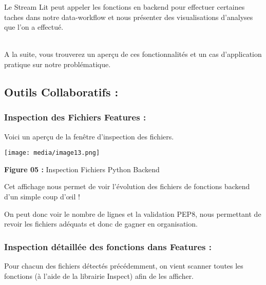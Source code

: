 Le Stream Lit peut appeler les fonctions en backend pour effectuer
certaines taches dans notre data-workflow et nous présenter des
visualisations d'analyses que l'on a effectué.\\
\strut \\
A la suite, vous trouverez un aperçu de ces fonctionnalités et un cas
d'application pratique sur notre problématique.

\subsection[\textbf{Outils Collaboratifs :
}]{\texorpdfstring{\protect\hypertarget{anchor-30}{}{}\protect\hypertarget{anchor-31}{}{}\textbf{Outils
Collaboratifs : }}{Outils Collaboratifs : }}\label{outils-collaboratifs}

\subsubsection[Inspection des Fichiers Features :
]{\texorpdfstring{\protect\hypertarget{anchor-32}{}{}\protect\hypertarget{anchor-33}{}{}Inspection
des Fichiers Features :
}{Inspection des Fichiers Features : }}\label{inspection-des-fichiers-features}

Voici un aperçu de la fenêtre d'inspection des fichiers.

\texttt{[image: media/image13.png]}

\textbf{ Figure 05 :} Inspection Fichiers Python Backend

Cet affichage nous permet de voir l'évolution des fichiers de fonctions
backend d'un simple coup d'œil !

On peut donc voir le nombre de lignes et la validation PEP8, nous
permettant de revoir les fichiers adéquats et donc de gagner en
organisation.

\subsubsection[Inspection détaillée des fonctions dans Features
:]{\texorpdfstring{\protect\hypertarget{anchor-34}{}{}\protect\hypertarget{anchor-35}{}{}Inspection
détaillée des fonctions dans Features
:}{Inspection détaillée des fonctions dans Features :}}\label{inspection-duxe9tailluxe9e-des-fonctions-dans-features}

Pour chacun des fichiers détectés précédemment, on vient scanner toutes
les fonctions (à l'aide de la librairie Inspect) afin de les afficher.

